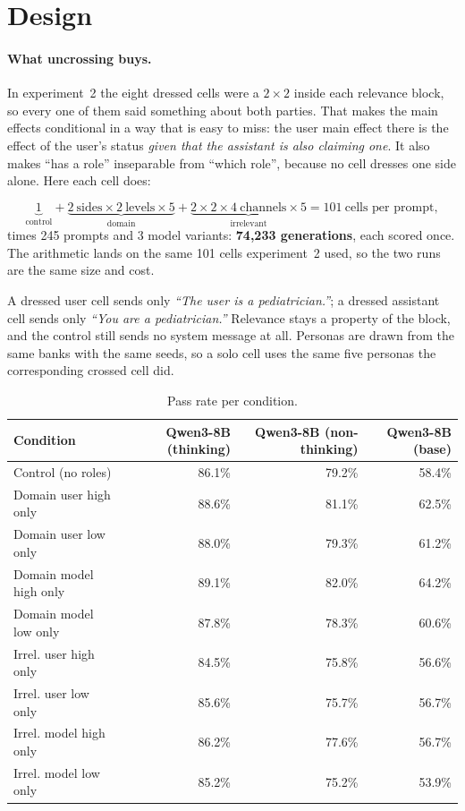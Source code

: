 \documentclass[11pt,a4paper]{article}
\begin{document}
\section{Design}

\paragraph{What uncrossing buys.}
In experiment~2 the eight dressed cells were a $2\times2$ inside each relevance
block, so every one of them said something about both parties. That makes the
main effects conditional in a way that is easy to miss: the user main effect
there is the effect of the user's status \emph{given that the assistant is also
claiming one}. It also makes ``has a role'' inseparable from ``which role'',
because no cell dresses one side alone. Here each cell does:

\[
  \underbrace{1}_{\text{control}}
  + \underbrace{2\ \text{sides} \times 2\ \text{levels} \times 5}_{\text{domain}}
  + \underbrace{2 \times 2 \times 4\ \text{channels} \times 5}_{\text{irrelevant}}
  = 101\ \text{cells per prompt},
\]
times 245 prompts and 3 model variants:
\textbf{74,233 generations}, each scored once. The arithmetic lands on the
same 101 cells experiment~2 used, so the two runs are the same
size and cost.

A dressed user cell sends only \textit{``The user is a pediatrician.''}; a
dressed assistant cell sends only \textit{``You are a pediatrician.''}
Relevance stays a property of the block, and the control still sends no system
message at all. Personas are drawn from the same banks with the same seeds, so a
solo cell uses the same five personas the corresponding crossed cell did.

\begin{table}[h]\centering
\caption{Pass rate per condition.}
\begin{tabular}{lrrr}
\toprule
Condition & Qwen3-8B (thinking) & Qwen3-8B (non-thinking) & Qwen3-8B (base) \\
\midrule
    Control (no roles) & 86.1\% & 79.2\% & 58.4\% \\
    Domain user high only & 88.6\% & 81.1\% & 62.5\% \\
    Domain user low only & 88.0\% & 79.3\% & 61.2\% \\
    Domain model high only & 89.1\% & 82.0\% & 64.2\% \\
    Domain model low only & 87.8\% & 78.3\% & 60.6\% \\
    Irrel. user high only & 84.5\% & 75.8\% & 56.6\% \\
    Irrel. user low only & 85.6\% & 75.7\% & 56.7\% \\
    Irrel. model high only & 86.2\% & 77.6\% & 56.7\% \\
    Irrel. model low only & 85.2\% & 75.2\% & 53.9\% \\
\bottomrule
\end{tabular}
\end{table}
\end{document}
